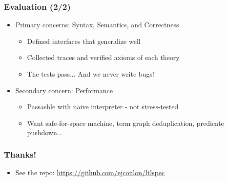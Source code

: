 \documentclass[12pt,aspectratio=169]{beamer}
\begin{document}
\begin{frame}
\frametitle{Evaluation (2/2)}
\begin{itemize}
  \item Primary concerns: Syntax, Semantics, and Correctness
    \begin{itemize}
      \item Defined interfaces that generalize well
      \item Collected traces and verified axioms of each theory
      \item The tests pass... And we never write bugs!
    \end{itemize}
  \item Secondary concern: Performance
    \begin{itemize}
      \item Passasble with naive interpreter - not stress-tested
      \item Want safe-for-space machine, term graph deduplication, predicate pushdown...
    \end{itemize}
\end{itemize}
\end{frame}

\begin{frame}
\frametitle{Thanks!}
\begin{itemize}
  \item See the repo: \url{https://github.com/ejconlon/ltlspec}
\end{itemize}
\end{frame}
\end{document}
